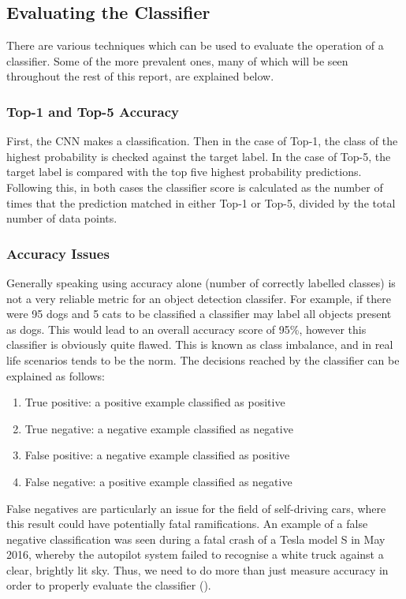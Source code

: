 \documentclass[12pt]{report}
\begin{document}
\subsection{Evaluating the Classifier}
\begin{flushleft}
There are various techniques which can be used to evaluate the operation of a classifier. Some of the more prevalent ones, many of which will be seen throughout the rest of this report, are explained below.
\end{flushleft}

\subsubsection{Top-1 and Top-5 Accuracy}
\begin{flushleft}
First, the CNN makes a classification. Then in the case of Top-1, the class of the highest probability is checked against the target label. In the case of Top-5, the target label is compared with the top five highest probability predictions. Following this, in both cases the classifier score is calculated as the number of times that the prediction matched in either Top-1 or Top-5, divided by the total number of data points.
\end{flushleft}

\subsubsection{Accuracy Issues}

\begin{flushleft}
Generally speaking using accuracy alone (number of correctly labelled classes) is not a very reliable metric for an object detection classifer. For example, if there were 95 dogs and 5 cats to be classified a classifier may label all objects present as dogs. This would lead to an overall accuracy score of 95\%, however this classifier is obviously quite flawed. This is known as class imbalance, and in real life scenarios tends to be the norm. The decisions reached by the classifier can be explained as follows:

\begin{enumerate}
  \item True positive: a positive example classified as positive
  \item True negative: a negative example classified as negative
  \item False positive: a negative example classified as positive
  \item False negative: a positive example classified as negative
\end{enumerate}

False negatives are particularly an issue for the field of self-driving cars, where this result could have potentially fatal ramifications. An example of a false negative classification was seen during a fatal crash of a Tesla model S in May 2016, whereby the autopilot system failed to recognise a white truck against a clear, brightly lit sky. Thus, we need to do more than just measure accuracy in order to properly evaluate the classifier (\cite{rogers2016first}).
\end{flushleft}
\end{document}
